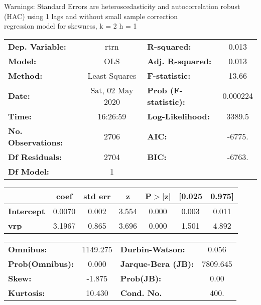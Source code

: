 Warnings: \newline
 [1] Standard Errors are heteroscedasticity and autocorrelation robust (HAC) using 1 lags and without small sample correction\\ 

regression model for skewness, k = 2 h = 1\begin{center}
\begin{tabular}{lclc}
\toprule
\textbf{Dep. Variable:}    &       rtrn       & \textbf{  R-squared:         } &     0.013   \\
\textbf{Model:}            &       OLS        & \textbf{  Adj. R-squared:    } &     0.013   \\
\textbf{Method:}           &  Least Squares   & \textbf{  F-statistic:       } &     13.66   \\
\textbf{Date:}             & Sat, 02 May 2020 & \textbf{  Prob (F-statistic):} &  0.000224   \\
\textbf{Time:}             &     16:26:59     & \textbf{  Log-Likelihood:    } &    3389.5   \\
\textbf{No. Observations:} &        2706      & \textbf{  AIC:               } &    -6775.   \\
\textbf{Df Residuals:}     &        2704      & \textbf{  BIC:               } &    -6763.   \\
\textbf{Df Model:}         &           1      & \textbf{                     } &             \\
\bottomrule
\end{tabular}
\begin{tabular}{lcccccc}
                   & \textbf{coef} & \textbf{std err} & \textbf{z} & \textbf{P$> |$z$|$} & \textbf{[0.025} & \textbf{0.975]}  \\
\midrule
\textbf{Intercept} &       0.0070  &        0.002     &     3.554  &         0.000        &        0.003    &        0.011     \\
\textbf{vrp}       &       3.1967  &        0.865     &     3.696  &         0.000        &        1.501    &        4.892     \\
\bottomrule
\end{tabular}
\begin{tabular}{lclc}
\textbf{Omnibus:}       & 1149.275 & \textbf{  Durbin-Watson:     } &    0.056  \\
\textbf{Prob(Omnibus):} &   0.000  & \textbf{  Jarque-Bera (JB):  } & 7809.645  \\
\textbf{Skew:}          &  -1.875  & \textbf{  Prob(JB):          } &     0.00  \\
\textbf{Kurtosis:}      &  10.430  & \textbf{  Cond. No.          } &     400.  \\
\bottomrule
\end{tabular}
\end{center}


